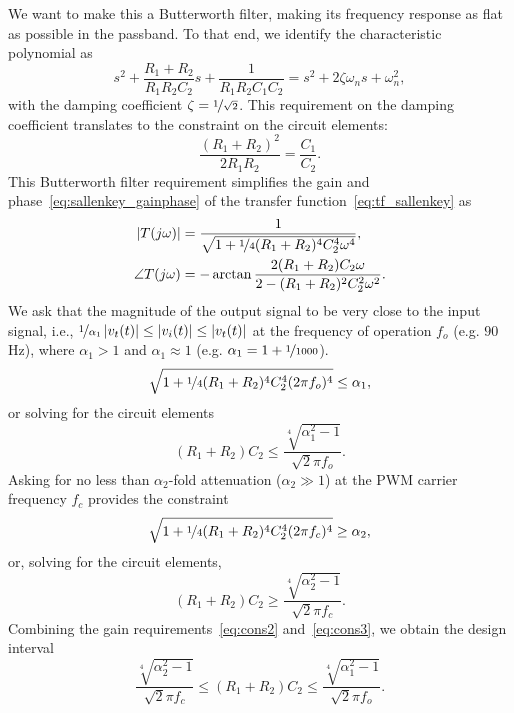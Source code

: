 We want to make this a Butterworth filter, making its frequency response as flat
as possible in the passband. To that end, we identify the characteristic
polynomial as
\[s^2 + \frac{R_1+R_2}{R_1R_2C_2}s + \frac{1}{R_1R_2C_1C_2} = s^2 +
2\zeta\omega_ns + \omega_n^2,\] with the damping coefficient $\zeta =
\nicefrac{1}{\sqrt{2}}$. This requirement on the damping coefficient translates
to the constraint on the circuit elements:
%
\begin{equation}
    \frac{(R_1+R_2)^2}{2R_1R_2} = \frac{C_1}{C_2}. 
    \label{eq:cons1}
\end{equation}
%
This Butterworth filter requirement simplifies the gain and
phase~\eqref{eq:sallenkey_gainphase} of the transfer
function~\eqref{eq:tf_sallenkey} as
%
\begin{align}
    \begin{split}
    \left|{T(j\omega)}\right| &= \frac{1}{\sqrt{1+\nicefrac{1}{4}(R_1+R_2)^4C_2^4\omega^4}}, \\
    \angle{T(j\omega)} &=
    -\arctan{\frac{2(R_1+R_2)C_2\omega}{2-(R_1+R_2)^2C_2^2\omega^2}}.
    \end{split}
    \label{eq:gp_simplified}
\end{align}
%
We ask that the magnitude of the output signal to be very close to the input
signal, i.e., $\nicefrac{1}{\alpha_1}\left|{v_t(t)}\right| \leq \left|{v_i(t)}\right| \leq
\left|{v_t(t)}\right|$ at the frequency of operation $f_o$ (e.g. $90$\unit{\hertz}),
where $\alpha_1 > 1$ and $\alpha_1 \approx 1$ (e.g. $\alpha_1 = 1 +
\nicefrac{1}{1000}$). \[ \sqrt{1+\nicefrac{1}{4}(R_1+R_2)^4C_2^4(2\pi f_o)^4}
\leq \alpha_1, \] or solving for the circuit elements
%
\begin{equation}
    (R_1+R_2)C_2 \leq \frac{\sqrt[4]{\alpha_1^2-1}}{\sqrt{2}\pi f_o}.
    \label{eq:cons2}
\end{equation}
%
Asking for no less than $\alpha_2$-fold attenuation ($\alpha_2 \gg 1$) at the
PWM carrier frequency $f_c$ provides the constraint \[
\sqrt{1+\nicefrac{1}{4}(R_1+R_2)^4C_2^4(2\pi f_c)^4} \geq \alpha_2, \] or,
solving for the circuit elements,
%
\begin{equation}
    (R_1+R_2)C_2 \geq \frac{\sqrt[4]{\alpha_2^2-1}}{\sqrt{2}\pi f_c}.
    \label{eq:cons3}
\end{equation}
%
Combining the gain requirements~\eqref{eq:cons2} and~\eqref{eq:cons3}, we obtain
the design interval  
\begin{equation}
\frac{\sqrt[4]{\alpha_2^2 - 1}}{\sqrt{2}\pi f_c} \leq
(R_1+R_2)C_2 \leq \frac{\sqrt[4]{\alpha_1^2-1}}{\sqrt{2}\pi f_o}.
\label{eq:interval}
\end{equation}

